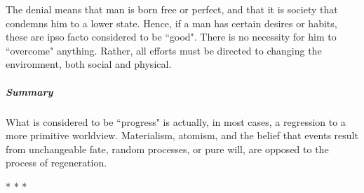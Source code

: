 The denial means that man is born free or perfect, and that it is society that condemns him to a lower state. Hence, if a man has certain desires or habits, these are ipso facto considered to be ``good". There is no necessity for him to ``overcome" anything. Rather, all efforts must be directed to changing the environment, both social and physical.

\subparagraph{Summary}
What is considered to be ``progress" is actually, in most cases, a regression to a more primitive worldview. Materialism, atomism, and the belief that events result from unchangeable fate, random processes, or pure will, are opposed to the process of regeneration.




\begin{center}* * *\end{center}

